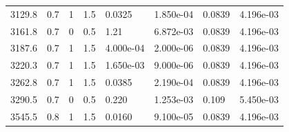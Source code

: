 \documentclass[preview]{standalone}
\begin{document}
{{\begin{tabular}{L{1.2cm}C{1.2cm} C{0.3cm}C{0.5cm} C{1.4cm}C{1.4cm} C{1.4cm}C{1.4cm}}
  3129.8  &   0.7  & 1     & 1.5 &  0.0325  & 1.850e-04  & 0.0839 &  4.196e-03   \\ 
  3161.8  &   0.7  & 0     & 0.5 &  1.21  & 6.872e-03  & 0.0839 &  4.196e-03   \\ 
  3187.6  &   0.7  & 1     & 1.5 &  4.000e-04  & 2.000e-06  & 0.0839 &  4.196e-03   \\ 
  3220.3  &   0.7  & 1     & 1.5 &  1.650e-03  & 9.000e-06  & 0.0839 &  4.196e-03   \\ 
  3262.8  &   0.7  & 1     & 1.5 &  0.0385  & 2.190e-04  & 0.0839 &  4.196e-03   \\ 
  3290.5  &   0.7  & 0     & 0.5 &  0.220  & 1.253e-03  & 0.109 &  5.450e-03   \\ 
  3545.5  &   0.8  & 1     & 1.5 &  0.0160  & 9.100e-05  & 0.0839 &  4.196e-03   \\ 
\hline 
\end{tabular} 

}}
\end{document}

